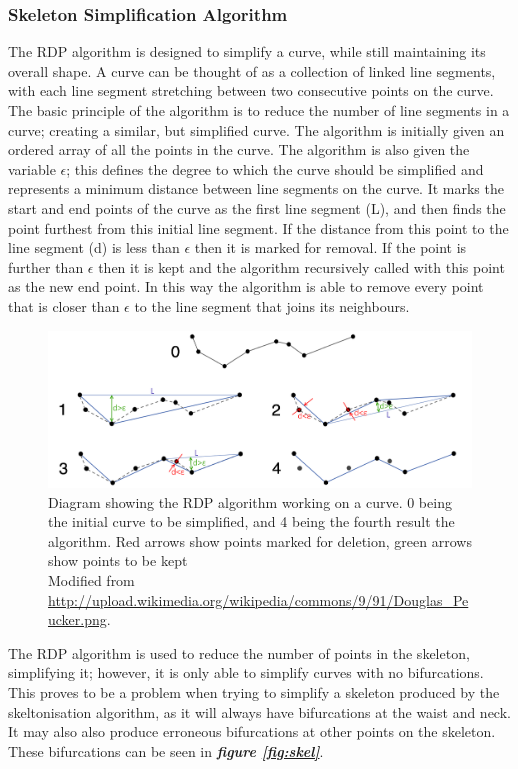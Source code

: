 \documentclass[a4paper, 12pt]{article}
\begin{document}
\subsubsection{Skeleton Simplification Algorithm}
	The RDP algorithm is designed to simplify a curve, while still maintaining its overall shape. A curve can be thought of as a collection of linked line segments, with each line segment stretching between two consecutive points on the curve. The basic principle of the algorithm is to reduce the number of line segments in a curve; creating a similar, but simplified curve. The algorithm is initially given an ordered array of all the points in the curve. The algorithm is also given the variable $\epsilon$; this defines the degree to which the curve should be simplified and represents a minimum distance between line segments on the curve. It marks the start and end points of the curve as the first line segment (L), and then finds the point furthest from this initial line segment. If the distance from this point to the line segment (d) is less than $\epsilon$ then it is marked for removal. If the point is further than $\epsilon$ then it is kept and the algorithm recursively called with this point as the new end point. In this way the algorithm is able to remove every point that is closer than $\epsilon$ to the line segment that joins its neighbours.
%
\begin{figure}[H]
	\centering
  	\includegraphics[width=\textwidth]{douglas_peucker.png}
  	\caption{Diagram showing the RDP algorithm working on a curve. 0 being the initial curve to be simplified, and 4 being the fourth result the algorithm. Red arrows show points marked for deletion, green arrows show points to be kept\\
  	Modified from \url{http://upload.wikimedia.org/wikipedia/commons/9/91/Douglas_Peucker.png}.}
  	\label{fig:douglas_peucker}
\end{figure}
%
\noindent The RDP algorithm is used to reduce the number of points in the skeleton, simplifying it; however, it is only able to simplify curves with no bifurcations. This proves to be a problem when trying to simplify a skeleton produced by the skeltonisation algorithm, as it will always have bifurcations at the waist and neck. It may also also produce erroneous bifurcations at other points on the skeleton. These bifurcations can be seen in \textbf{\emph{figure \ref{fig:skel}}}.\\
\end{document}
